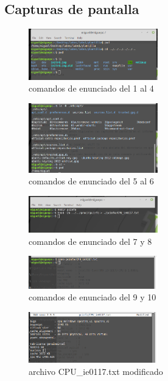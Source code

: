 \documentclass[11pt]{article}
\begin{document}
\begin{enumerate}
\end{enumerate}


\subsection{Capturas de pantalla}


\begin{figure}[H]
\centering
\includegraphics[width=0.5\textwidth]{img/1.png}
\caption{comandos de enunciado del 1 al 4}
\end{figure}

\begin{figure}[H]
\centering
\includegraphics[width=0.5\textwidth]{img/2.png}
\caption{comandos de enunciado del 5 al 6}
\end{figure}

\begin{figure}[H]
\centering
\includegraphics[width=0.5\textwidth]{img/3.png}
\caption{comandos de enunciado del 7 y 8}
\end{figure}

\begin{figure}[H]
\centering
\includegraphics[width=0.5\textwidth]{img/4.png}
\caption{comandos de enunciado del 9 y 10}
\end{figure}

\begin{figure}[H]
\centering
\includegraphics[width=0.5\textwidth]{img/5.png}
\caption{archivo CPU\_ie0117.txt modificado}
\end{figure}
\end{document}
